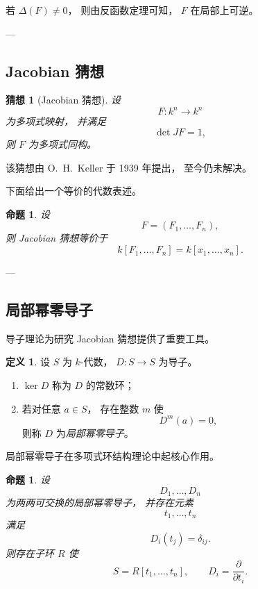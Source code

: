 \documentclass[11pt]{article}
\theoremstyle{plain}
\newtheorem{proposition}[theorem]{命题}
\newtheorem{conjecture}[theorem]{猜想}
\theoremstyle{definition}
\newtheorem{definition}[theorem]{定义}
\theoremstyle{remark}
\renewcommand{\det}{\operatorname{det}}
\begin{document}
若 $\Delta(F)\neq0$，
则由反函数定理可知，
$F$ 在局部上可逆。

---

\subsection{Jacobian 猜想}

\begin{conjecture}[Jacobian 猜想]
    设
    \[
        F:k^n\to k^n
    \]
    为多项式映射，
    并满足
    \[
        \det JF=1,
    \]
    则 $F$ 为多项式同构。
\end{conjecture}

该猜想由
O.~H.~Keller 于 1939 年提出，
至今仍未解决。

下面给出一个等价的代数表述。

\begin{proposition}
    设
    \[
        F=(F_1,\dots,F_n),
    \]
    则 Jacobian 猜想等价于
    \[
        k[F_1,\dots,F_n]
        =
        k[x_1,\dots,x_n].
    \]
\end{proposition}

---

\subsection{局部幂零导子}

导子理论为研究 Jacobian 猜想提供了重要工具。

\begin{definition}
    设 $S$ 为 $k$-代数，
    $D:S\to S$ 为导子。

    \begin{enumerate}
        \item $\ker D$ 称为 $D$ 的常数环；

        \item 若对任意 $a\in S$，
              存在整数 $m$ 使
              \[
                  D^m(a)=0,
              \]
              则称 $D$ 为\emph{局部幂零导子}。
    \end{enumerate}
\end{definition}

局部幂零导子在多项式环结构理论中起核心作用。

\begin{proposition}
    设
    \[
        D_1,\dots,D_n
    \]
    为两两可交换的局部幂零导子，
    并存在元素
    \[
        t_1,\dots,t_n
    \]
    满足
    \[
        D_i(t_j)=\delta_{ij}.
    \]
    则存在子环 $R$ 使
    \[
        S=R[t_1,\dots,t_n],
        \qquad
        D_i=\frac{\partial}{\partial t_i}.
    \]
\end{proposition}
\end{document}
